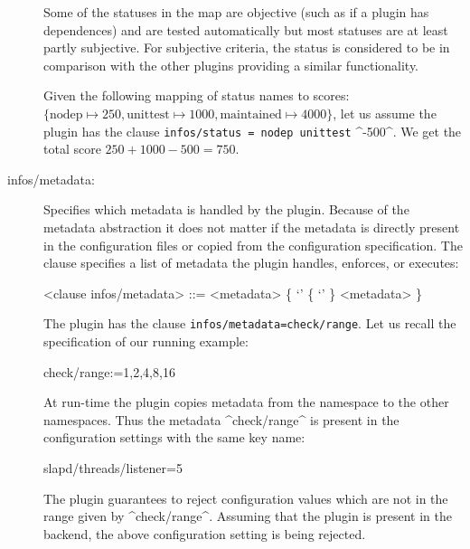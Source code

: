 \begin{description}
Some of the statuses in the map are objective (such as if a plugin has dependences) and are tested automatically but most statuses are at least partly subjective.
For subjective criteria, the status is considered to be in comparison with the other plugins providing a similar functionality.

\begin{example}
\label{ex:plugin-status}
Given the following mapping of status names to scores: $\{\text{nodep} \mapsto 250, \text{unittest} \mapsto 1000, \text{maintained} \mapsto 4000\}$, let us assume the plugin  has the clause \lstinline[language=CfgElektra]^infos/status = nodep unittest^ ^-500^.
We get the total score $250+1000-500=750$.
\end{example}


\item[infos/metadata:] Specifies which metadata is handled by the plugin.
Because of the metadata abstraction it does not matter if the metadata is directly present in the configuration files or copied from the configuration specification.
The clause specifies a list of metadata the plugin handles, enforces, or executes:

\begin{grammar}
<clause infos/metadata> ::=  <metadata> \{ \lq\WhiteSpace'  \{ \lq\WhiteSpace' \} <metadata> \}
\end{grammar}

\begin{example}
The plugin  has the clause \lstinline[language=CfgElektra]^infos/metadata=check/^\allowbreak \lstinline[language=CfgElektra]^range^.
Let us recall the specification of our running example:

\begin{code}
  check/range:=1,2,4,8,16
\end{code}

At run-time the plugin  copies metadata from the namespace  to the other namespaces.
Thus the metadata ^check/range^ is present in the configuration settings with the same key name:

\begin{code}[language=CfgElektra]
slapd/threads/listener=5
\end{code}

The plugin  guarantees to reject configuration values which are not in the range given by ^check/range^.
Assuming that the plugin  is present in the backend, the above configuration setting is being rejected.
\end{example}



\end{description}
